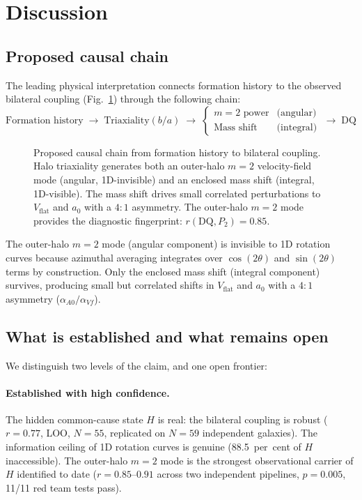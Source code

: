 \documentclass[fleqn,usenatbib]{mnras}
\newcommand{\vflat}{V_\mathrm{flat}}
\newcommand{\azero}{a_0}
\newcommand{\DQ}{\mathrm{DQ}}
\newcommand{\mtwo}{m{=}2}
\begin{document}
\section{Discussion}
\label{sec:discussion}

\subsection{Proposed causal chain}

The leading physical interpretation connects formation history to the observed bilateral coupling (Fig.~\ref{fig:causal}) through the following chain:
\begin{equation*}
\text{Formation history} \;\to\; \text{Triaxiality}(b/a) \;\to\; \begin{cases} \mtwo \text{ power} & \text{(angular)} \\ \text{Mass shift} & \text{(integral)} \end{cases} \;\to\; \DQ
\end{equation*}

\begin{figure}
\centering

\caption{Proposed causal chain from formation history to bilateral coupling. Halo triaxiality generates both an outer-halo $\mtwo$ velocity-field mode (angular, 1D-invisible) and an enclosed mass shift (integral, 1D-visible). The mass shift drives small correlated perturbations to $V_\mathrm{flat}$ and $a_0$ with a $4{:}1$ asymmetry. The outer-halo $\mtwo$ mode provides the diagnostic fingerprint: $r(\DQ, P_2) = 0.85$.}
\label{fig:causal}
\end{figure}

The outer-halo $\mtwo$ mode (angular component) is invisible to 1D rotation curves because azimuthal averaging integrates over $\cos(2\theta)$ and $\sin(2\theta)$ terms by construction.
Only the enclosed mass shift (integral component) survives, producing small but correlated shifts in $\vflat$ and $\azero$ with a $4{:}1$ asymmetry ($\alpha_{A0}/\alpha_{Vf}$).

\subsection{What is established and what remains open}

We distinguish two levels of the claim, and one open frontier:

\paragraph{Established with high confidence.}
The hidden common-cause state $H$ is real: the bilateral coupling is robust ($r = 0.77$, LOO, $N = 55$, replicated on $N = 59$ independent galaxies).
The information ceiling of 1D rotation curves is genuine (88.5~per~cent of $H$ inaccessible).
The outer-halo $\mtwo$ mode is the strongest observational carrier of $H$ identified to date ($r = 0.85$--$0.91$ across two independent pipelines, $p = 0.005$, 11/11 red team tests pass).
\end{document}

